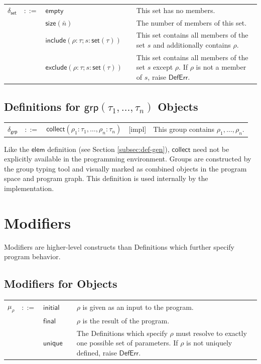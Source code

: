 \documentclass[twoside,openright,11pt]{report}
\begin{document}
\noindent\begin{tabularx}{\textwidth}{p{0.5cm} p{0.5cm} p{5cm} c X}
$\delta_{\mathsf{set}}$ & $::=$ & $\mathsf{empty}$ &  & This set has no members. \\
 & & $\mathsf{size}(\bar{n})$ &  & The number of members of this set. \\
 & & $\mathsf{include}(\rho : \tau; s : \mathsf{set}(\tau))$ &  & This set contains all members of the set $s$ and additionally contains $\rho$. \\
 & & $\mathsf{exclude}(\rho : \tau; s : \mathsf{set}(\tau))$ &  & This set contains all members of the set $s$ except $\rho$. If $\rho$ is not a member of $s$, raise $\mathsf{DefErr}$.
\end{tabularx}

\subsection{Definitions for $\mathsf{grp}(\tau_1, \dots , \tau_n)$ Objects}
\label{subsec:def-grp}

\noindent\begin{tabularx}{\textwidth}{p{0.5cm} p{0.5cm} p{5cm} c X}
$\delta_{\mathsf{grp}}$ & $::=$ & $\mathsf{collect}(\rho_1 : \tau_1, \dots, \rho_n : \tau_n)$ & [impl] & This group contains $\rho_1, \dots, \rho_n$.
\end{tabularx}

Like the $\mathsf{elem}$ definition (see Section \ref{subsec:def-gen}), $\mathsf{collect}$ need not be explicitly available in the programming environment. 
Groups are constructed by the group typing tool and visually marked as combined objects in the program space and program graph. 
This definition is used internally by the implementation.

\section{Modifiers}
\label{sec:mods}

Modifiers are higher-level constructs than Definitions which further specify program behavior.

\subsection{Modifiers for Objects}
\label{subsec:mods-obj}

\noindent\begin{tabularx}{\textwidth}{p{0.5cm} p{0.5cm} p{5cm} c X}
$\mu_{\rho}$ & $::=$ & $\mathsf{initial}$ &  & $\rho$ is given as an input to the program. \\
 & & $\mathsf{final}$ &  & $\rho$ is the result of the program. \\
 & & $\mathsf{unique}$ &  & The Definitions which specify $\rho$ must resolve to exactly one possible set of parameters. If $\rho$ is not uniquely defined, raise $\mathsf{DefErr}$.
\end{tabularx}
\end{document}
